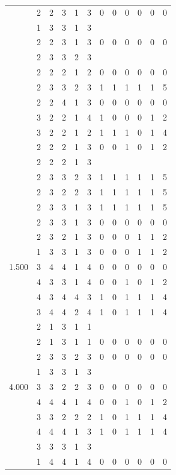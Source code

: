 \documentclass[]{msu-thesis}
\theoremstyle{definition}
\theoremstyle{definition}
\theoremstyle{definition}
\theoremstyle{remark}
\begin{document}
\begin{table}
{\begin{tabular}[t]{rrrrrrrrrrrr}
 & 2 & 2 & 3 & 1 & 3 & 0 & 0 & 0 & 0 & 0 & 0\\
 & 1 & 3 & 3 & 1 & 3 &  &  &  &  &  & \\
 & 2 & 2 & 3 & 1 & 3 & 0 & 0 & 0 & 0 & 0 & 0\\
 & 2 & 3 & 3 & 2 & 3 &  &  &  &  &  & \\
 & 2 & 2 & 2 & 1 & 2 & 0 & 0 & 0 & 0 & 0 & 0\\
 & 2 & 3 & 3 & 2 & 3 & 1 & 1 & 1 & 1 & 1 & 5\\
 & 2 & 2 & 4 & 1 & 3 & 0 & 0 & 0 & 0 & 0 & 0\\
 & 3 & 2 & 2 & 1 & 4 & 1 & 0 & 0 & 0 & 1 & 2\\
 & 3 & 2 & 2 & 1 & 2 & 1 & 1 & 1 & 0 & 1 & 4\\
 & 2 & 2 & 2 & 1 & 3 & 0 & 0 & 1 & 0 & 1 & 2\\
 & 2 & 2 & 2 & 1 & 3 &  &  &  &  &  & \\
 & 2 & 3 & 3 & 2 & 3 & 1 & 1 & 1 & 1 & 1 & 5\\
 & 2 & 3 & 2 & 2 & 3 & 1 & 1 & 1 & 1 & 1 & 5\\
 & 2 & 3 & 3 & 1 & 3 & 1 & 1 & 1 & 1 & 1 & 5\\
 & 2 & 3 & 3 & 1 & 3 & 0 & 0 & 0 & 0 & 0 & 0\\
 & 2 & 3 & 2 & 1 & 3 & 0 & 0 & 0 & 1 & 1 & 2\\
 & 1 & 3 & 3 & 1 & 3 & 0 & 0 & 0 & 1 & 1 & 2\\
1.500 & 3 & 4 & 4 & 1 & 4 & 0 & 0 & 0 & 0 & 0 & 0\\
 & 4 & 3 & 3 & 1 & 4 & 0 & 0 & 1 & 0 & 1 & 2\\
 & 4 & 3 & 4 & 4 & 3 & 1 & 0 & 1 & 1 & 1 & 4\\
 & 3 & 4 & 4 & 2 & 4 & 1 & 0 & 1 & 1 & 1 & 4\\
 & 2 & 1 & 3 & 1 & 1 &  &  &  &  &  & \\
 & 2 & 1 & 3 & 1 & 1 & 0 & 0 & 0 & 0 & 0 & 0\\
 & 2 & 3 & 3 & 2 & 3 & 0 & 0 & 0 & 0 & 0 & 0\\
 & 1 & 3 & 3 & 1 & 3 &  &  &  &  &  & \\
4.000 & 3 & 3 & 2 & 2 & 3 & 0 & 0 & 0 & 0 & 0 & 0\\
 & 4 & 4 & 4 & 1 & 4 & 0 & 0 & 1 & 0 & 1 & 2\\
 & 3 & 3 & 2 & 2 & 2 & 1 & 0 & 1 & 1 & 1 & 4\\
 & 4 & 4 & 4 & 1 & 3 & 1 & 0 & 1 & 1 & 1 & 4\\
 & 3 & 3 & 3 & 1 & 3 &  &  &  &  &  & \\
 & 1 & 4 & 4 & 1 & 4 & 0 & 0 & 0 & 0 & 0 & 0\\

\end{tabular}}
\end{table}
\end{document}
